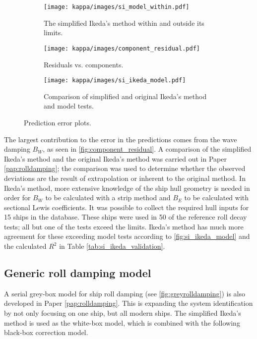 \begin{figure}[h!]
\centering
    \begin{subfigure}[b]{0.45\textwidth}
    
        \centering
        \texttt{[image: kappa/images/si\_model\_within.pdf]}
        \caption{The simplified Ikeda's method within and outside its limits.}
        \label{fig:si_model_within}
    \end{subfigure}
    \hfill
    \begin{subfigure}[b]{0.45\textwidth}
        \centering
        \texttt{[image: kappa/images/component\_residual.pdf]}
        \vspace{-0.2cm}
        \caption{Residuals vs. components.}
        \label{fig:component_residual}
        \vspace{0.3cm}
    \end{subfigure}
    \hfill
    \begin{subfigure}[b]{0.45\textwidth}
        \centering
        \texttt{[image: kappa/images/si\_ikeda\_model.pdf]}
        \caption{Comparison of simplified and original Ikeda's method and model tests.}
        \label{fig:si_ikeda_model}
    \end{subfigure}

    \caption{Prediction error plots.}
\end{figure}

\noindent The largest contribution to the error in the predictions comes from the wave damping $B_W$, as seen in \autoref{fig:component_residual}. A comparison of the simplified Ikeda's method and the original Ikeda's method was carried out in Paper \ref{pap:rolldamping}; the comparison was used to determine whether the observed deviations are the result of extrapolation or inherent to the original method. In Ikeda's method, more extensive knowledge of the ship hull geometry is needed in order for $B_W$ to be calculated with a strip method and $B_E$ to be calculated with sectional Lewis coefficients. It was possible to collect the required hull inputs for 15 ships in the database. These ships were used in 50 of the reference roll decay tests; all but one of the tests exceed the limits. Ikeda's method has much more agreement for these exceeding model tests according to \autoref{fig:si_ikeda_model} and the calculated $R^2$ in Table \ref{tab:si_ikeda_validation}.


\subsection{Generic roll damping model}
\label{sec:genericrolldampingmodel}
A serial grey-box model for ship roll damping (see \autoref{fig:greyrolldamping}) is also developed in Paper \ref{pap:rolldamping}. 
This is expanding the system identification by not only focusing on one ship, but all modern ships. 
The simplified Ikeda's method \cite{kawahara_simple_2011} is used as the white-box model, which is combined with the following black-box correction model.

